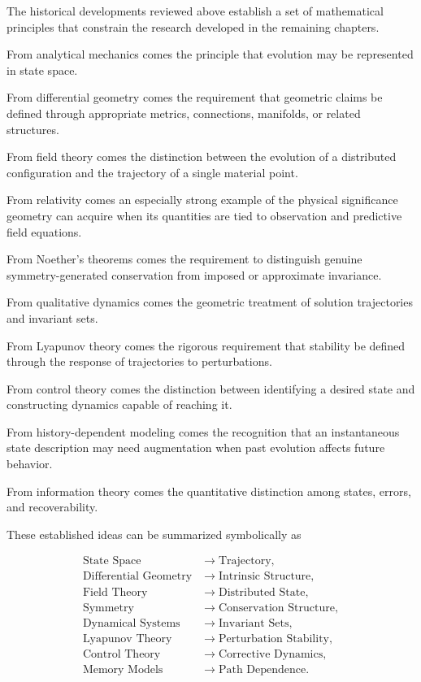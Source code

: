 \documentclass[12pt,oneside]{book}
\begin{document}
The historical developments reviewed above establish a set of
mathematical principles that constrain the research developed in
the remaining chapters.

From analytical mechanics comes the principle that evolution
may be represented in state space.

From differential geometry comes the requirement that
geometric claims be defined through appropriate metrics,
connections, manifolds, or related structures.

From field theory comes the distinction between the evolution
of a distributed configuration and the trajectory of a single
material point.

From relativity comes an especially strong example of the
physical significance geometry can acquire when its quantities
are tied to observation and predictive field equations.

From Noether's theorems comes the requirement to distinguish
genuine symmetry-generated conservation from imposed or
approximate invariance.

From qualitative dynamics comes the geometric treatment of
solution trajectories and invariant sets.

From Lyapunov theory comes the rigorous requirement that
stability be defined through the response of trajectories to
perturbations.

From control theory comes the distinction between identifying a
desired state and constructing dynamics capable of reaching it.

From history-dependent modeling comes the recognition that an
instantaneous state description may need augmentation when past
evolution affects future behavior.

From information theory comes the quantitative distinction
among states, errors, and recoverability.

These established ideas can be summarized symbolically as

\begin{equation}
\begin{aligned}
    \text{State Space}
    &\longrightarrow
    \text{Trajectory},
    \\
    \text{Differential Geometry}
    &\longrightarrow
    \text{Intrinsic Structure},
    \\
    \text{Field Theory}
    &\longrightarrow
    \text{Distributed State},
    \\
    \text{Symmetry}
    &\longrightarrow
    \text{Conservation Structure},
    \\
    \text{Dynamical Systems}
    &\longrightarrow
    \text{Invariant Sets},
    \\
    \text{Lyapunov Theory}
    &\longrightarrow
    \text{Perturbation Stability},
    \\
    \text{Control Theory}
    &\longrightarrow
    \text{Corrective Dynamics},
    \\
    \text{Memory Models}
    &\longrightarrow
    \text{Path Dependence}.
\end{aligned}
\label{eq:historical-foundation-map}
\end{equation}
\end{document}
